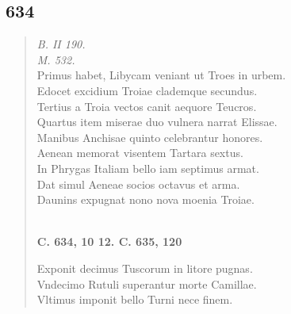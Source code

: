 \documentclass[11pt, a4paper]{report}
\begin{document}
            \subsection*{634}
      \begin{verse}
      \textit{B. II 190.} \\ \textit{M. 532.} \\ Primus habet, Libycam veniant ut Troes in urbem. \\ Edocet excidium Troiae clademque secundus. \\ Tertius a Troia vectos canit aequore Teucros. \\ Quartus item miserae duo vulnera narrat Elissae. \\ Manibus Anchisae quinto celebrantur honores. \\ Aenean memorat visentem Tartara sextus. \\ In Phrygas Italiam bello iam septimus armat. \\ Dat simul Aeneae socios octavus et arma. \\ Daunins expugnat nono nova moenia Troiae. \\ 
        ﻿\pagebreak 
    \begin{center} \textbf{C. 634, 10 12. C. 635, 120} \end{center} \marginpar{[101]} Exponit decimus Tuscorum in litore pugnas. \\ Vndecimo Rutuli superantur morte Camillae. \\ Vltimus imponit bello Turni nece finem. \\ 
      \end{verse}
  
\end{document}
